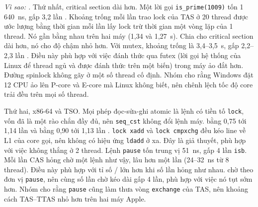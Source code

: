 \emph{Vì sao: .} Thứ nhất, critical section dài hơn. Một lời gọi \texttt{is\_prime(1009)}
tốn 1\,640~ns, gấp 3,2 lần . Khoảng trống mỗi lần trao lock của TAS ở 20 thread được ước lượng
bằng thời gian mỗi lần lấy lock trừ thời gian một vòng lặp của 1 thread. Nó gần bằng nhau trên hai máy (1,34
và 1,27~\textmu s). Chia cho critical section dài hơn, nó cho độ chậm nhỏ hơn. Với mutex, khoảng trống là
3,4--3,5~\textmu s, gấp 2,2--2,3 lần . Điều này phù hợp với việc đánh thức qua futex
(lời gọi hệ thống của Linux để thread ngủ và được đánh thức trên một biến) trong máy ảo đắt hơn. Đường
spinlock không gãy ở một số thread cố định. Nhóm cho rằng Windows đặt 12 CPU ảo lên P-core và E-core mà
Linux không biết, nên chênh lệch tốc độ core trải đều trên mọi số thread.

Thứ hai, x86-64 và TSO. Mọi phép đọc-sửa-ghi atomic là lệnh có tiền tố \texttt{lock}, vốn đã là một rào
chắn đầy đủ, nên \texttt{seq\_cst} không đổi lệnh máy.  bằng 0,75 tới 1,14 lần
 và  bằng 0,90 tới 1,13 lần . \texttt{lock xadd} và
\texttt{lock cmpxchg} đều kéo line về L1 của core gọi, nên không có hiệu ứng \texttt{ldadd} ở xa. Đây là
giả thuyết, phù hợp với việc  không thắng  ở 2 thread. Lệnh \texttt{pause} tốn
trung vị 51~ns, gấp 4 lần \texttt{isb}. Mỗi lần CAS hỏng chờ một lệnh như vậy, lâu hơn một lần
 (24--32~ns từ 8 thread). Điều này phù hợp với tỉ số / lớn hơn khi số lần hỏng như nhau. 
chờ theo đơn vị \texttt{pause}, nên cùng số lần chờ kéo dài gấp 4 lần, phù hợp với việc nó tụt sớm hơn.
Nhóm cho rằng \texttt{pause} cũng làm thưa vòng \texttt{exchange} của TAS, nên khoảng cách TAS--TTAS nhỏ
hơn trên hai máy Apple.

